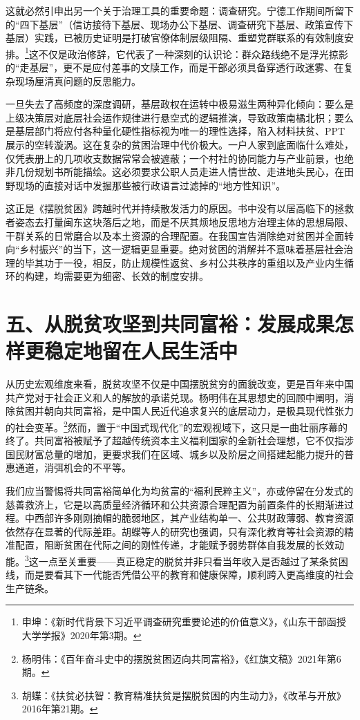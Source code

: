 \documentclass[12pt,a4paper]{ctexart}
\begin{document}
这就必然引申出另一个关于治理工具的重要命题：调查研究。宁德工作期间所留下的“四下基层”（信访接待下基层、现场办公下基层、调查研究下基层、政策宣传下基层）实践，已被历史证明是打破官僚体制层级阻隔、重塑党群联系的有效制度安排。\footnote{申坤：《新时代背景下习近平调查研究重要论述的价值意义》，《山东干部函授大学学报》2020年第3期。}这不仅是政治修辞，它代表了一种深刻的认识论：群众路线绝不是浮光掠影的“走基层”，更不是应付差事的文牍工作，而是干部必须具备穿透行政迷雾、在复杂现场厘清真问题的反思能力。

一旦失去了高频度的深度调研，基层政权在运转中极易滋生两种异化倾向：要么是上级决策层对底层社会运作规律进行悬空式的逻辑推演，导致政策南橘北枳；要么是基层部门将应付各种量化硬性指标视为唯一的理性选择，陷入材料扶贫、PPT展示的空转漩涡。这在复杂的贫困治理中代价极大。一户人家到底面临什么难处，仅凭表册上的几项收支数据常常会被遮蔽；一个村社的协同能力与产业前景，也绝非几份规划书所能描绘。这必须要求公职人员走进人情世故、走进地头民心，在田野现场的直接对话中发掘那些被行政语言过滤掉的“地方性知识”。

这正是《摆脱贫困》跨越时代并持续散发活力的原因。书中没有以居高临下的拯救者姿态去打量闽东这块落后之地，而是不厌其烦地反思地方治理主体的思想局限、干群关系的日常磨合以及本土资源的合理配置。在我国宣告消除绝对贫困并全面转向“乡村振兴”的当下，这一逻辑更显重要。绝对贫困的消解并不意味着基层社会治理的毕其功于一役，相反，防止规模性返贫、乡村公共秩序的重组以及产业内生循环的构建，均需要更为细密、长效的制度安排。

\section*{五、从脱贫攻坚到共同富裕：发展成果怎样更稳定地留在人民生活中}

从历史宏观维度来看，脱贫攻坚不仅是中国摆脱贫穷的面貌改变，更是百年来中国共产党对于社会正义和人的解放的承诺兑现。杨明伟在其思想史的回顾中阐明，消除贫困并朝向共同富裕，是中国人民近代追求复兴的底层动力，是极具现代性张力的社会变革。\footnote{杨明伟：《百年奋斗史中的摆脱贫困迈向共同富裕》，《红旗文稿》2021年第6期。}然而，置于“中国式现代化”的宏观视域下，这只是一曲壮丽序幕的终了。共同富裕被赋予了超越传统资本主义福利国家的全新社会理想，它不仅指涉国民财富总量的增加，更要求我们在区域、城乡以及阶层之间搭建起能力提升的普惠通道，消弭机会的不平等。

我们应当警惕将共同富裕简单化为均贫富的“福利民粹主义”，亦或停留在分发式的慈善救济上，它是以高质量经济循环和公共资源合理配置为前置条件的长期渐进过程。中西部许多刚刚摘帽的脆弱地区，其产业结构单一、公共财政薄弱、教育资源依然存在显著的代际差距。胡蝶等人的研究也强调，只有深化教育等社会资源的精准配置，阻断贫困在代际之间的刚性传递，才能赋予弱势群体自我发展的长效动能。\footnote{胡蝶：《扶贫必扶智：教育精准扶贫是摆脱贫困的内生动力》，《改革与开放》2016年第21期。}这一点至关重要——真正稳定的脱贫并非只看当年收入是否越过了某条贫困线，而是要看其下一代能否凭借公平的教育和健康保障，顺利跨入更高维度的社会生产链条。
\end{document}
